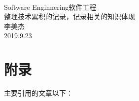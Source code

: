 \documentclass[UTF8,10pt,a4paper]{article}
\begin{document}
\begin{center}
    \quad \\
    \vspace{3cm}
    \hspace{1cm}\Large{Software Enginnering软件工程} \\
    \small{整理技术累积的记录，记录相关的知识体现} \\
    \vspace{1cm}
    \hspace{1cm}\Large{李美杰} \\
    \vspace{0.5cm}
    \hspace{1cm}\Large{2019.9.23}
    \clearpage
\end{center}

\thispagestyle{empty}
\clearpage

\tableofcontents
\clearpage

\lstset{
    language=C,
    numbers=left,
    frame=box
}






\clearpage
\section{附录}
主要引用的文章以下：



\end{document}
